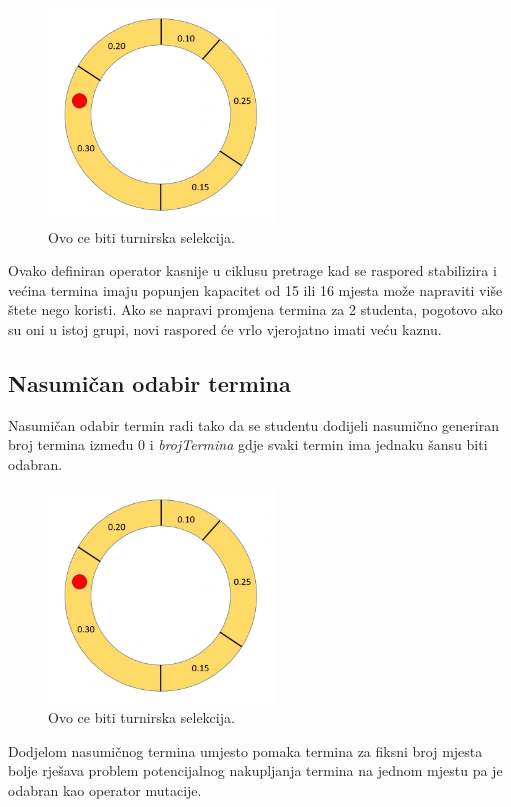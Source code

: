\documentclass[times, utf8, zavrsni]{fer}
\begin{document}
\begin{figure}[htb]
\centering
\includegraphics[width=6cm]{images/rulet.png}
\caption{Ovo ce biti turnirska selekcija.}
\label{fig:rulet}
\end{figure}

Ovako definiran operator kasnije u ciklusu pretrage kad se raspored stabilizira i većina termina imaju popunjen kapacitet od 15 ili 16 mjesta može napraviti više štete nego koristi. Ako se napravi promjena termina za 2 studenta, pogotovo ako su oni u istoj grupi, novi raspored će vrlo vjerojatno imati veću kaznu.

\subsection{Nasumičan odabir termina}

Nasumičan odabir termin radi tako da se studentu dodijeli nasumično generiran broj termina između 0 i \emph{brojTermina} gdje svaki termin ima jednaku šansu biti odabran.

\begin{figure}[htb]
\centering
\includegraphics[width=6cm]{images/rulet.png}
\caption{Ovo ce biti turnirska selekcija.}
\label{fig:rulet}
\end{figure}

Dodjelom nasumičnog termina umjesto pomaka termina za fiksni broj mjesta bolje rješava problem potencijalnog nakupljanja termina na jednom mjestu pa je odabran kao operator mutacije.
\end{document}
